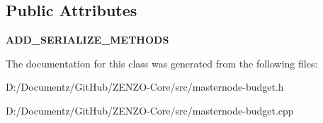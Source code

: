 \subsection*{Public Attributes}
\begin{DoxyCompactItemize}
\item 
\mbox{\label{class_c_finalized_budget_broadcast_a543ef11ceec3a6488050d62a7e27a465}} 
{\bfseries A\+D\+D\+\_\+\+S\+E\+R\+I\+A\+L\+I\+Z\+E\+\_\+\+M\+E\+T\+H\+O\+DS}
\end{DoxyCompactItemize}


The documentation for this class was generated from the following files\+:\begin{DoxyCompactItemize}
\item 
D\+:/\+Documentz/\+Git\+Hub/\+Z\+E\+N\+Z\+O-\/\+Core/src/masternode-\/budget.\+h\item 
D\+:/\+Documentz/\+Git\+Hub/\+Z\+E\+N\+Z\+O-\/\+Core/src/masternode-\/budget.\+cpp\end{DoxyCompactItemize}
